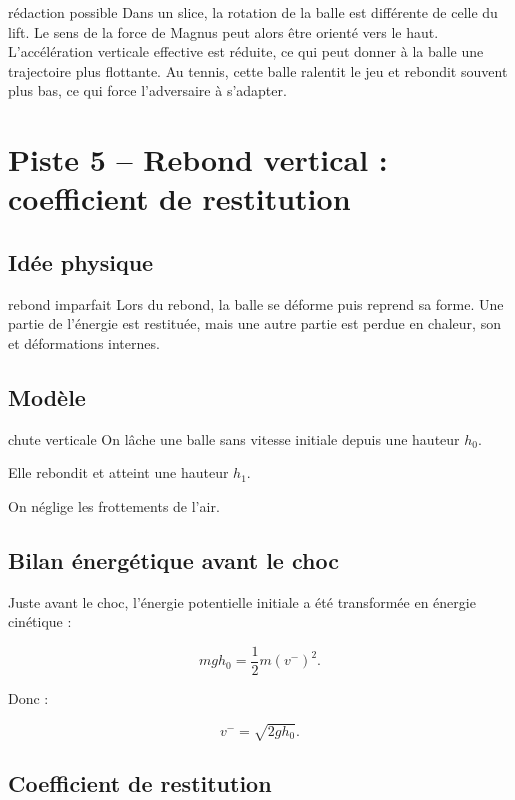 \documentclass[11pt,a4paper]{article}
\begin{document}
\begin{oral}{rédaction possible}
Dans un slice, la rotation de la balle est différente de celle du lift. Le sens de la force de Magnus peut alors être orienté vers le haut. L'accélération verticale effective est réduite, ce qui peut donner à la balle une trajectoire plus flottante. Au tennis, cette balle ralentit le jeu et rebondit souvent plus bas, ce qui force l'adversaire à s'adapter.
\end{oral}

\section{Piste 5 -- Rebond vertical : coefficient de restitution}

\subsection{Idée physique}

\begin{idee}{rebond imparfait}
Lors du rebond, la balle se déforme puis reprend sa forme. Une partie de l'énergie est restituée, mais une autre partie est perdue en chaleur, son et déformations internes.
\end{idee}

\subsection{Modèle}

\begin{modele}{chute verticale}
On lâche une balle sans vitesse initiale depuis une hauteur $h_0$.

Elle rebondit et atteint une hauteur $h_1$.

On néglige les frottements de l'air.
\end{modele}

\subsection{Bilan énergétique avant le choc}

Juste avant le choc, l'énergie potentielle initiale a été transformée en énergie cinétique :

\[
mgh_0=\frac12m(v^-)^2.
\]

Donc :

\[
v^-=\sqrt{2gh_0}.
\]

\subsection{Coefficient de restitution}
\end{document}
